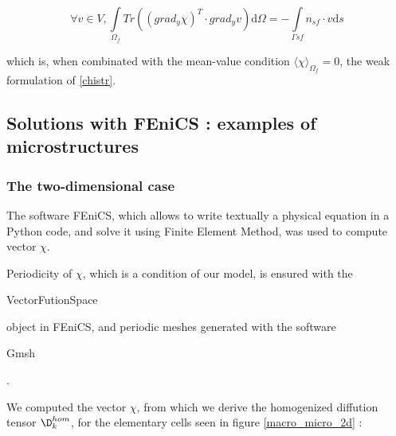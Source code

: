 \begin{equation}\label{chiwper}
\forall v \in V , %
\int\limits_{\Omega_f}Tr\left(\left(grad_y\chi\right)^T\cdot grad_y v\right)\text{d}\Omega=%
-\int\limits_{\Gamma{sf}}n_{sf}\cdot v\text{d}s
\end{equation}

which is, when combinated with the mean-value condition $\langle\chi\rangle_{\Omega_f}=0$, the weak formulation of \ref{chistr}.

\subsection{Solutions with FEniCS : examples of microstructures}

\subsubsection{The two-dimensional case}

The software FEniCS, which allows to write textually a physical equation in a Python code, %
and solve it using Finite Element Method, %
was used to compute vector $\chi$.

\par
Periodicity of $\chi$, which is a condition of our model, is ensured with the \begin{code}VectorFutionSpace\end{code} object in FEniCS, %
and periodic meshes generated with the software \begin{code}Gmsh\end{code}.

\begin{comment}
\begin{itemize}
\item On one hand, for the classical resolution of problem \ref{chiw}, we used FEM and meshes generated with \begin{code}Gmsh\end{code} ;
\item On the other hand, we compile the information obtained with a finite set of solutions \dots
\end{itemize}
\end{comment}

\etoile
We computed the vector $\chi$, from which we derive the homogenized diffution tensor $\D_k^{hom}$, for the elementary cells seen in figure \ref{macro_micro_2d} :

